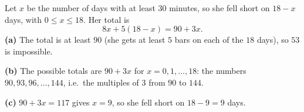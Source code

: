 Let $x$ be the number of days with at least $30$ minutes, so she fell short on $18-x$ days, with $0\le x\le18$. Her total is
\[
8x+5(18-x)=90+3x .
\]
\textbf{(a)} The total is at least $90$ (she gets at least $5$ bars on each of the $18$ days), so $53$ is impossible.

\textbf{(b)} The possible totals are $90+3x$ for $x=0,1,\dots,18$: the numbers $90,93,96,\dots,144$, i.e.\ the multiples of $3$ from $90$ to $144$.

\textbf{(c)} $90+3x=117$ gives $x=9$, so she fell short on $18-9=\boxed{9}$ days.
